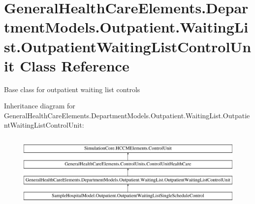 \hypertarget{class_general_health_care_elements_1_1_department_models_1_1_outpatient_1_1_waiting_list_1_1_out0eb5e03b9183fdbdabb1cbe4530cecf4}{}\section{General\+Health\+Care\+Elements.\+Department\+Models.\+Outpatient.\+Waiting\+List.\+Outpatient\+Waiting\+List\+Control\+Unit Class Reference}
\label{class_general_health_care_elements_1_1_department_models_1_1_outpatient_1_1_waiting_list_1_1_out0eb5e03b9183fdbdabb1cbe4530cecf4}


Base class for outpatient waiting list controls  


Inheritance diagram for General\+Health\+Care\+Elements.\+Department\+Models.\+Outpatient.\+Waiting\+List.\+Outpatient\+Waiting\+List\+Control\+Unit\+:\begin{figure}[H]
\begin{center}
\leavevmode
\includegraphics[height=3.758389cm]{class_general_health_care_elements_1_1_department_models_1_1_outpatient_1_1_waiting_list_1_1_out0eb5e03b9183fdbdabb1cbe4530cecf4}
\end{center}
\end{figure}
